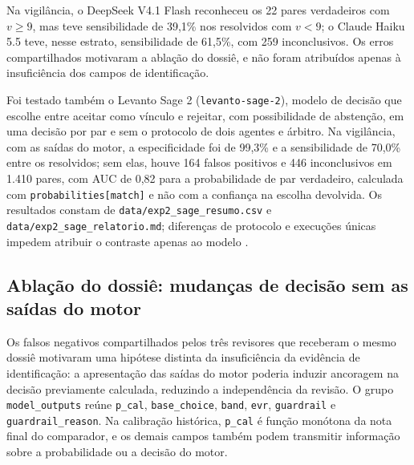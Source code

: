 Na vigilância, o DeepSeek V4.1 Flash reconheceu os 22 pares verdadeiros com $v\geq9$, mas teve sensibilidade de 39,1\% nos resolvidos com $v<9$; o Claude Haiku 5.5 teve, nesse estrato, sensibilidade de 61,5\%, com 259 inconclusivos. Os erros compartilhados motivaram a ablação do dossiê, e não foram atribuídos apenas à insuficiência dos campos de identificação.

Foi testado também o Levanto Sage 2 (\texttt{levanto-sage-2}), modelo de decisão que escolhe entre aceitar como vínculo e rejeitar, com possibilidade de abstenção, em uma decisão por par e sem o protocolo de dois agentes e árbitro. Na vigilância, com as saídas do motor, a especificidade foi de 99,3\% e a sensibilidade de 70,0\% entre os resolvidos; sem elas, houve 164 falsos positivos e 446 inconclusivos em 1.410 pares, com AUC de 0,82 para a probabilidade de par verdadeiro, calculada com \texttt{probabilities[match]} e não com a confiança na escolha devolvida. Os resultados constam de \texttt{data/exp2\_sage\_resumo.csv} e \texttt{data/exp2\_sage\_relatorio.md}; diferenças de protocolo e execuções únicas impedem atribuir o contraste apenas ao modelo \cite{Jardim2026phdrepo}.

\subsection{Ablação do dossiê: mudanças de decisão sem as saídas do motor}
\label{sec:e4-ablacao-dossie}

Os falsos negativos compartilhados pelos três revisores que receberam o mesmo dossiê motivaram uma hipótese distinta da insuficiência da evidência de identificação: a apresentação das saídas do motor poderia induzir ancoragem na decisão previamente calculada, reduzindo a independência da revisão. O grupo \texttt{model\_outputs} reúne \texttt{p\_cal}, \texttt{base\_choice}, \texttt{band}, \texttt{evr}, \texttt{guardrail} e \texttt{guardrail\_reason}. Na calibração histórica, \texttt{p\_cal} é função monótona da nota final do comparador, e os demais campos também podem transmitir informação sobre a probabilidade ou a decisão do motor.

